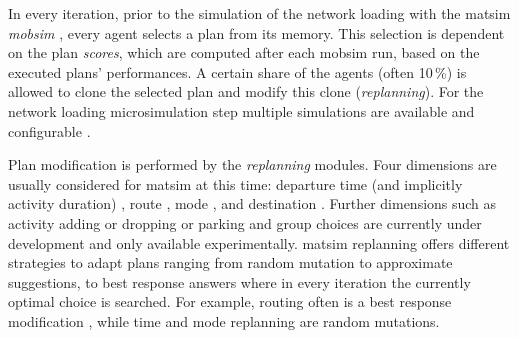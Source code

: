 In every iteration, prior to the simulation of the network loading with the \gls{matsim} \emph{\gls{mobsim}} \citep[e.g.,][]{Cetin_PhDThesis_2005}, every agent selects a plan from its memory. This selection is dependent on the plan \emph{scores}, which are computed after each mobsim run, based on the executed plans' performances. A certain share of the agents 
(often 10\,\%) is allowed to clone the selected plan and modify this clone (\emph{\gls{replanning}}).
 
For the network loading microsimulation step multiple simulations are available and configurable \citep[][p.10f]{HorniEtAl_TechRep_IVT_2011_a,MATSim_Userguide_2015}. 

Plan modification is performed by the \emph{replanning} modules. Four dimensions are usually considered for \gls{matsim} at this time: departure time (and implicitly activity duration) \citep[][]{BalmerRaneyEtAl2005act-times}, route \citep[]{LefebvreBalmer_STRC_2007}, mode \citep{GretherEtAl2009SimpleModeChoiceIPL}, and destination \citep{HorniEtc2008locachoice,HorniEtAl2011TrbLocationChoice}. Further dimensions such as activity adding or dropping or parking and group choices are currently under development and only available experimentally. %
\gls{matsim} replanning offers different strategies to adapt plans ranging from random mutation to approximate suggestions, to best response answers where in every iteration the currently optimal choice is searched. For example, routing
often is a best response modification%
, while time and mode replanning are random mutations.  

